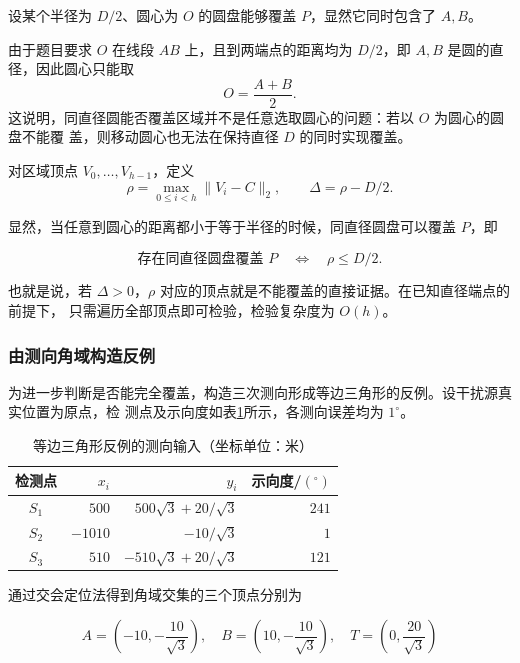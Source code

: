 \documentclass[withoutpreface,bwprint]{cumcmthesis} %
\begin{document}
设某个半径为 $D/2$、圆心为 $O$ 的圆盘能够覆盖 $P$，显然它同时包含了 $A,B$。

由于题目要求 $O$ 在线段 $AB$ 上，且到两端点的距离均为 $D/2$，即 $A,B$ 是圆的直径，因此圆心只能取
\begin{equation}
O=\frac{A+B}{2}.
\end{equation}
这说明，同直径圆能否覆盖区域并不是任意选取圆心的问题：若以 $O$ 为圆心的圆盘不能覆
盖，则移动圆心也无法在保持直径 $D$ 的同时实现覆盖。

对区域顶点 $V_0,\ldots,V_{h-1}$，定义
\begin{equation}
\rho=\max_{0\le i<h}\|V_i-C\|_2,\qquad \Delta=\rho-D/2.
\end{equation}

显然，当任意到圆心的距离都小于等于半径的时候，同直径圆盘可以覆盖 $P$，即

\begin{equation}\label{eq:cov-check}
\boxed{\text{存在同直径圆盘覆盖 }P\quad\Longleftrightarrow\quad\rho\le D/2.}
\end{equation}

也就是说，若 $\Delta>0$，$\rho$ 对应的顶点就是不能覆盖的直接证据。在已知直径端点的前提下，
只需遍历全部顶点即可检验，检验复杂度为 $O(h)$。

\subsubsection{由测向角域构造反例}

为进一步判断是否能完全覆盖，构造三次测向形成等边三角形的反例。设干扰源真实位置为原点，检
测点及示向度如表\ref{tab:cov-input}所示，各测向误差均为 $1^\circ$。

\begin{table}[H]
\centering
\caption{等边三角形反例的测向输入（坐标单位：米）}\label{tab:cov-input}
\begin{tabular}{crrr}
\toprule
检测点 & $x_i$ & $y_i$ & 示向度/$(^\circ)$\\
\midrule
$S_1$ & $500$ & $500\sqrt3+20/\sqrt3$ & $241$\\
$S_2$ & $-1010$ & $-10/\sqrt3$ & $1$\\
$S_3$ & $510$ & $-510\sqrt3+20/\sqrt3$ & $121$\\
\bottomrule
\end{tabular}
\end{table}

通过交会定位法得到角域交集的三个顶点分别为

\begin{equation}
A=\left(-10,-\frac{10}{\sqrt3}\right),\quad
B=\left(10,-\frac{10}{\sqrt3}\right),\quad
T=\left(0,\frac{20}{\sqrt3}\right)
\end{equation}
\end{document}

